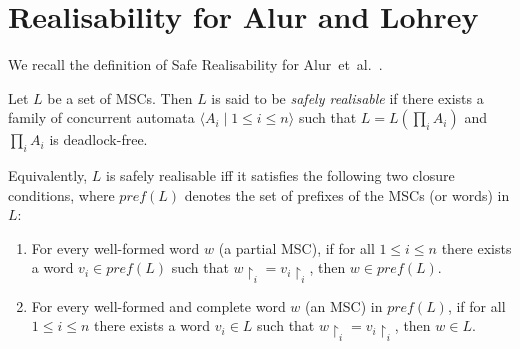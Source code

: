 

\section{Realisability for Alur and Lohrey}
We recall the definition of Safe Realisability for 
Alur~et~al.~\cite{alur2005realizability}.

\bigskip

\begin{definition}
Let $L$ be a set of MSCs. Then $L$ is said to be \emph{safely realisable}
if there exists a family of concurrent automata 
$\langle A_i \mid 1 \leq i \leq n \rangle$ such that
$ L = L(\prod_i A_i)$ and 
$\prod_i A_i$ is deadlock-free.

Equivalently, $L$ is safely realisable iff it satisfies the following two
closure conditions, where $\mathit{pref}(L)$ denotes the set of prefixes 
of the MSCs (or words) in $L$:
\begin{enumerate}
  \item For every well-formed word $w$ (a partial MSC), if for all 
  $1 \leq i \leq n$ there exists a word $v_i \in \mathit{pref}(L)$ 
  such that $w{\upharpoonright_i} = v_i{\upharpoonright_i}$, then 
  $w \in \mathit{pref}(L)$.
  \item For every well-formed and complete word $w$ (an MSC) in 
  $\mathit{pref}(L)$, if for all $1 \leq i \leq n$ there exists a 
  word $v_i \in L$ such that $w{\upharpoonright_i} = v_i{\upharpoonright_i}$, 
  then $w \in L$.
\end{enumerate}
\end{definition}


